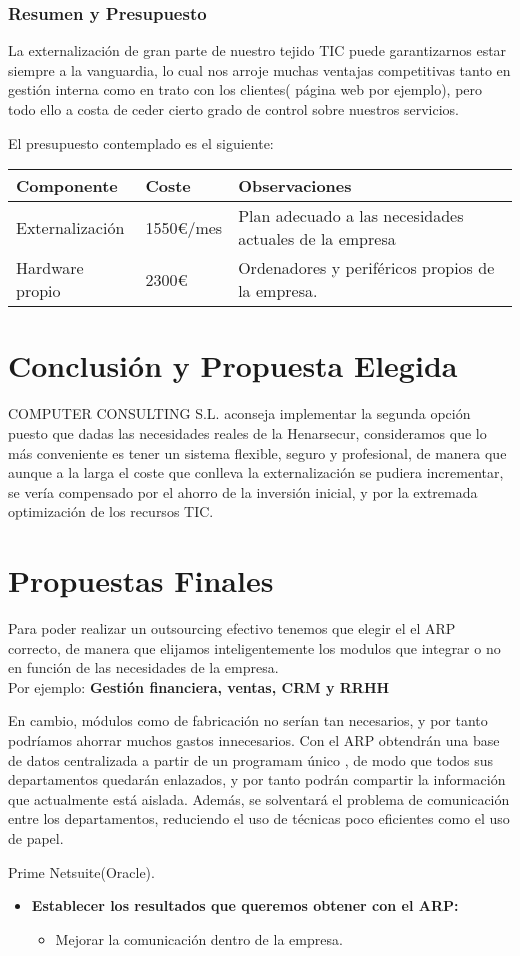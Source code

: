 \documentclass[12pt,letterpaper]{article}
\begin{document}
	\subsubsection{Resumen y Presupuesto}
	La externalización de gran parte de nuestro tejido TIC puede garantizarnos estar siempre a la vanguardia, lo cual nos arroje muchas ventajas competitivas tanto en gestión interna como en trato con los clientes( página web por ejemplo), pero todo ello a costa de ceder cierto grado de control sobre nuestros servicios.\par
	El presupuesto contemplado es el siguiente:
	\begin{center}
    \begin{tabular}{ | l | l | p{7cm} |}
    \hline
    Componente & Coste & Observaciones \\ \hline
    Externalización & 1550€/mes & Plan adecuado a las necesidades actuales de la empresa \\ \hline
    Hardware propio & 2300€ & Ordenadores y periféricos propios de la empresa. \\ \hline
    \end{tabular}
	\end{center}
	
	\section{Conclusión y Propuesta Elegida}
	COMPUTER CONSULTING S.L. aconseja implementar la segunda opción puesto que dadas las necesidades reales de la Henarsecur, consideramos que lo más conveniente es tener un sistema flexible, seguro y profesional, de manera que aunque a la larga el coste que conlleva la externalización se pudiera incrementar, se vería compensado por el ahorro de la inversión inicial, y por la extremada optimización de los recursos TIC.


	\section{Propuestas Finales}
	Para poder realizar un outsourcing efectivo tenemos que elegir el
	el ARP correcto, de manera que elijamos inteligentemente los
	modulos que integrar o no en función de las necesidades de la empresa.\\ Por ejemplo: 		  \textbf{Gestión financiera, ventas, CRM y RRHH}
	
	
	 En cambio, módulos como de fabricación no serían tan necesarios, y por tanto podríamos ahorrar muchos gastos innecesarios.
	Con el ARP obtendrán una base de datos centralizada a partir de un programam único , de modo que todos sus departamentos quedarán enlazados, y por tanto podrán compartir la información que actualmente está aislada. Además, se solventará el problema de comunicación entre los departamentos, reduciendo el uso de técnicas poco eficientes como el uso de papel.
	
	Prime
	Netsuite(Oracle).
	\begin{itemize}%
	\item \textbf{Establecer los resultados que queremos obtener con el ARP:}
	  \begin{itemize}%
	  \item Mejorar la comunicación dentro de la empresa.
		
	
	  \end{itemize} 
	\end{itemize} 
	
	
\end{document}
